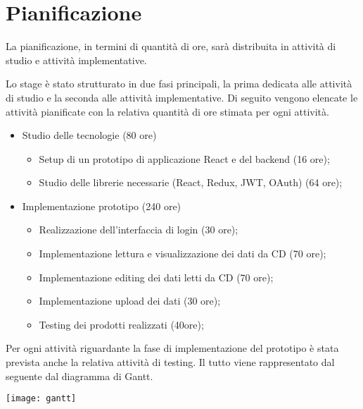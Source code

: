 \section{Pianificazione}

La pianificazione, in termini di quantità di ore, sarà distribuita in attività di studio e attività implementative.

Lo stage è stato strutturato in due fasi principali, la prima dedicata alle attività di studio e la seconda alle attività implementative. Di seguito vengono elencate le attività pianificate con la relativa quantità di ore stimata per ogni attività.

\begin{itemize}
  \item Studio delle tecnologie (80 ore)
        \begin{itemize}
          \item Setup di un prototipo di applicazione React e del backend (16 ore);
          \item Studio delle librerie necessarie (React, Redux, JWT, OAuth) (64 ore);
        \end{itemize}
  \item Implementazione prototipo (240 ore)
        \begin{itemize}
          \item Realizzazione dell’interfaccia di login (30 ore);
          \item Implementazione lettura e visualizzazione dei dati da CD (70 ore);
          \item Implementazione editing dei dati letti da CD (70 ore);
          \item Implementazione upload dei dati (30 ore);
          \item Testing dei prodotti realizzati (40ore);
        \end{itemize}
\end{itemize}

Per ogni attività riguardante la fase di implementazione del prototipo è stata prevista anche la relativa attività di testing.
Il tutto viene rappresentato dal seguente dal diagramma di Gantt.
\begin{center}
  \texttt{[image: gantt]}
\end{center}